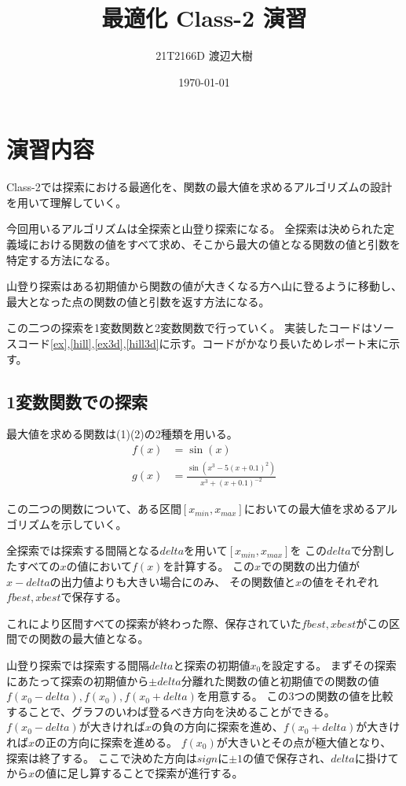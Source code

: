 \documentclass[a4paper,11pt,dvipdfmx]{jsarticle}
\begin{document}

\title{最適化 Class-2 演習}
\author{21T2166D 渡辺大樹}
\date{\today}
\maketitle

\section{演習内容}
Class-2では探索における最適化を、関数の最大値を求めるアルゴリズムの設計を用いて理解していく。

今回用いるアルゴリズムは全探索と山登り探索になる。
全探索は決められた定義域における関数の値をすべて求め、そこから最大の値となる関数の値と引数を特定する方法になる。

山登り探索はある初期値から関数の値が大きくなる方へ山に登るように移動し、最大となった点の関数の値と引数を返す方法になる。

この二つの探索を1変数関数と2変数関数で行っていく。
実装したコードはソースコード\ref{ex},\ref{hill},\ref{ex3d},\ref{hill3d}に示す。コードがかなり長いためレポート末に示す。

\subsection{1変数関数での探索}
最大値を求める関数は(1)(2)の2種類を用いる。
\begin{align}
    f(x) &= \sin(x)\\
    g(x) &= \frac{\sin(x^3-5(x+0.1)^2)}{x^3+(x+0.1)^{-2}}
\end{align}

この二つの関数について、ある区間$[x_{min},x_{max}]$においての最大値を求めるアルゴリズムを示していく。

全探索では探索する間隔となる$delta$を用いて$[x_{min},x_{max}]$を
この$delta$で分割したすべての$x$の値において$f(x)$を計算する。
この$x$での関数の出力値が$x-delta$の出力値よりも大きい場合にのみ、
その関数値と$x$の値をそれぞれ$fbest,xbest$で保存する。

これにより区間すべての探索が終わった際、保存されていた$fbest,xbest$がこの区間での関数の最大値となる。

山登り探索では探索する間隔$delta$と探索の初期値$x_0$を設定する。
まずその探索にあたって探索の初期値から$\pm delta$分離れた関数の値と初期値での関数の値
$f(x_0-delta),f(x_0),f(x_0+delta)$を用意する。
この3つの関数の値を比較することで、グラフのいわば登るべき方向を決めることができる。
$f(x_0-delta)$が大きければ$x$の負の方向に探索を進め、$f(x_0+delta)$が大きければ$x$の正の方向に探索を進める。
$f(x_0)$が大きいとその点が極大値となり、探索は終了する。
ここで決めた方向は$sign$に$\pm1$の値で保存され、$delta$に掛けてから$x$の値に足し算することで探索が進行する。
\end{document}
